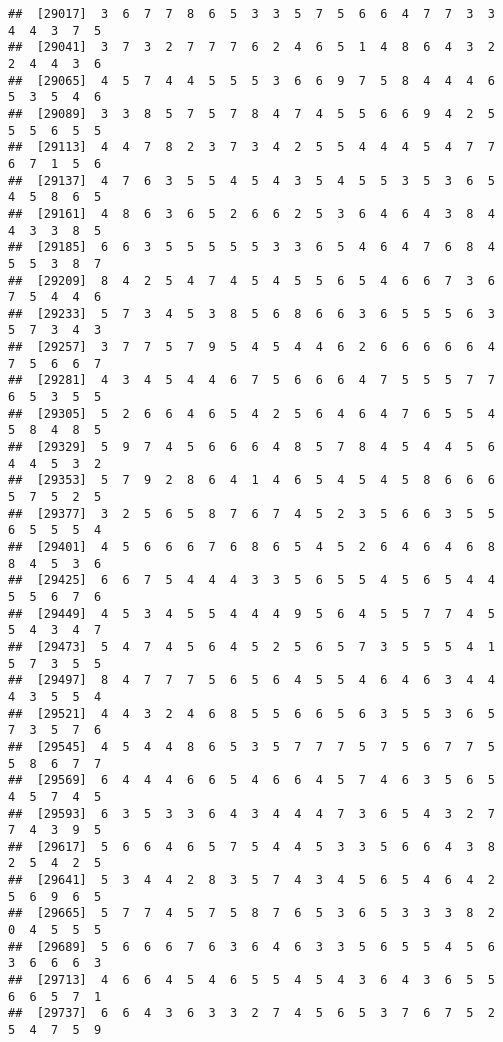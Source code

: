 \documentclass[
]{book}
\begin{document}
\begin{verbatim}
##  [29017]  3  6  7  7  8  6  5  3  3  5  7  5  6  6  4  7  7  3  3  4  4  3  7  5
##  [29041]  3  7  3  2  7  7  7  6  2  4  6  5  1  4  8  6  4  3  2  2  4  4  3  6
##  [29065]  4  5  7  4  4  5  5  5  3  6  6  9  7  5  8  4  4  4  6  5  3  5  4  6
##  [29089]  3  3  8  5  7  5  7  8  4  7  4  5  5  6  6  9  4  2  5  5  5  6  5  5
##  [29113]  4  4  7  8  2  3  7  3  4  2  5  5  4  4  4  5  4  7  7  6  7  1  5  6
##  [29137]  4  7  6  3  5  5  4  5  4  3  5  4  5  5  3  5  3  6  5  4  5  8  6  5
##  [29161]  4  8  6  3  6  5  2  6  6  2  5  3  6  4  6  4  3  8  4  4  3  3  8  5
##  [29185]  6  6  3  5  5  5  5  5  3  3  6  5  4  6  4  7  6  8  4  5  5  3  8  7
##  [29209]  8  4  2  5  4  7  4  5  4  5  5  6  5  4  6  6  7  3  6  7  5  4  4  6
##  [29233]  5  7  3  4  5  3  8  5  6  8  6  6  3  6  5  5  5  6  3  5  7  3  4  3
##  [29257]  3  7  7  5  7  9  5  4  5  4  4  6  2  6  6  6  6  6  4  7  5  6  6  7
##  [29281]  4  3  4  5  4  4  6  7  5  6  6  6  4  7  5  5  5  7  7  6  5  3  5  5
##  [29305]  5  2  6  6  4  6  5  4  2  5  6  4  6  4  7  6  5  5  4  5  8  4  8  5
##  [29329]  5  9  7  4  5  6  6  6  4  8  5  7  8  4  5  4  4  5  6  4  4  5  3  2
##  [29353]  5  7  9  2  8  6  4  1  4  6  5  4  5  4  5  8  6  6  6  5  7  5  2  5
##  [29377]  3  2  5  6  5  8  7  6  7  4  5  2  3  5  6  6  3  5  5  6  5  5  5  4
##  [29401]  4  5  6  6  6  7  6  8  6  5  4  5  2  6  4  6  4  6  8  8  4  5  3  6
##  [29425]  6  6  7  5  4  4  4  3  3  5  6  5  5  4  5  6  5  4  4  5  5  6  7  6
##  [29449]  4  5  3  4  5  5  4  4  4  9  5  6  4  5  5  7  7  4  5  5  4  3  4  7
##  [29473]  5  4  7  4  5  6  4  5  2  5  6  5  7  3  5  5  5  4  1  5  7  3  5  5
##  [29497]  8  4  7  7  7  5  6  5  6  4  5  5  4  6  4  6  3  4  4  4  3  5  5  4
##  [29521]  4  4  3  2  4  6  8  5  5  6  6  5  6  3  5  5  3  6  5  7  3  5  7  6
##  [29545]  4  5  4  4  8  6  5  3  5  7  7  7  5  7  5  6  7  7  5  5  8  6  7  7
##  [29569]  6  4  4  4  6  6  5  4  6  6  4  5  7  4  6  3  5  6  5  4  5  7  4  5
##  [29593]  6  3  5  3  3  6  4  3  4  4  4  7  3  6  5  4  3  2  7  7  4  3  9  5
##  [29617]  5  6  6  4  6  5  7  5  4  4  5  3  3  5  6  6  4  3  8  2  5  4  2  5
##  [29641]  5  3  4  4  2  8  3  5  7  4  3  4  5  6  5  4  6  4  2  5  6  9  6  5
##  [29665]  5  7  7  4  5  7  5  8  7  6  5  3  6  5  3  3  3  8  2  0  4  5  5  5
##  [29689]  5  6  6  6  7  6  3  6  4  6  3  3  5  6  5  5  4  5  6  3  6  6  6  3
##  [29713]  4  6  6  4  5  4  6  5  5  4  5  4  3  6  4  3  6  5  5  6  6  5  7  1
##  [29737]  6  6  4  3  6  3  3  2  7  4  5  6  5  3  7  6  7  5  2  5  4  7  5  9

\end{verbatim}
\end{document}
